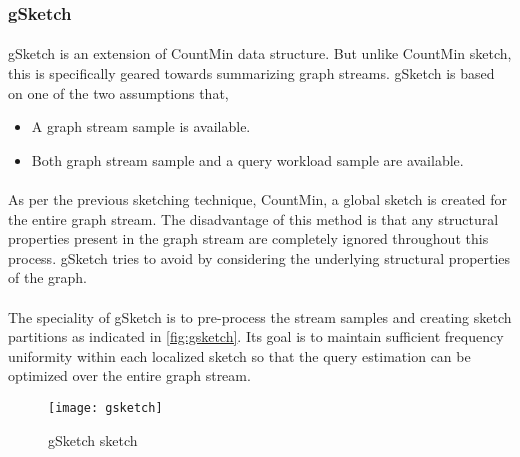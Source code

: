 \subsubsection{gSketch\cite{zhao_gsketch:_2011}}

\paragraph{}
gSketch is an extension of CountMin data structure. But unlike CountMin sketch, this is specifically geared towards summarizing graph streams. gSketch is based on one of the two assumptions that,

\begin{itemize}
    \item A graph stream sample is available.
    \item Both graph stream sample and a query workload sample are available.
\end{itemize}

\paragraph{}
As per the previous sketching technique, CountMin, a global sketch is created for the entire graph stream. The disadvantage of this method is that any structural properties present in the graph stream are completely ignored throughout this process. gSketch tries to avoid by considering the underlying structural properties of the graph.

\paragraph{}
The speciality of gSketch is to pre-process the stream samples and creating sketch partitions as indicated in \autoref{fig:gsketch}. Its goal is to maintain sufficient frequency uniformity within each localized sketch so that the query estimation can be optimized over the entire graph stream.

\begin{figure}[H]
    \centering \texttt{[image: gsketch]}
    \caption{gSketch sketch}
    \label{fig:gsketch}
\end{figure}